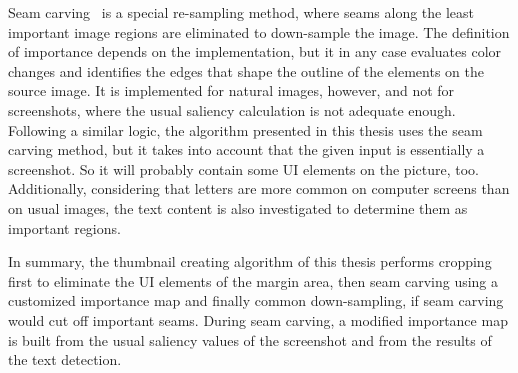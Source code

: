 \documentclass[draft,final]{vutinfth} %
\begin{document}
	Seam carving~\cite{avidan2007seam} is a special re-sampling method, where seams along the least important image regions are eliminated to down-sample the image.
	The definition of importance depends on the implementation, but it in any case evaluates color changes and identifies the edges that shape the outline of the elements on the source image.
	It is implemented for natural images, however, and not for screenshots, where the usual saliency calculation is not adequate enough.
	Following a similar logic, the algorithm presented in this thesis uses the seam carving method, but it takes into account that the given input is essentially a screenshot.
	So it will probably contain some UI elements on the picture, too.
	Additionally, considering that letters are more common on computer screens than on usual images, the text content is also investigated to determine them as important regions.\par
	In summary, the thumbnail creating algorithm of this thesis performs cropping first to eliminate the UI elements of the margin area, then seam carving using a customized importance map and finally common down-sampling, if seam carving would cut off important seams.
	During seam carving, a modified importance map is built from the usual saliency values of the screenshot and from the results of the text detection.
	
\end{document}

